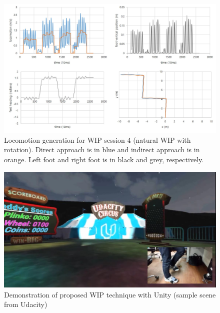 \begin{figure}[th]
\captionsetup{justification=raggedright,singlelinecheck=false}
\centering
\includegraphics[width=\textwidth,height=\textheight,keepaspectratio]{Figures/session4.jpg}
\decoRule
\caption[WIP session 4]{Locomotion generation for WIP session 4 (natural WIP with rotation). Direct approach is in blue and indirect approach is in orange. Left foot and right foot is in black and grey, respectively.}
\label{fig:wip_session4}
\end{figure}

\begin{figure}[th]
\captionsetup{justification=raggedright,singlelinecheck=false}
\centering
\includegraphics[width=\textwidth,height=\textheight,keepaspectratio]{Figures/demo.jpg}
\decoRule
\caption[Demo]{Demonstration of proposed WIP technique with Unity (sample scene from Udacity)}
\label{fig:demo}
\end{figure}